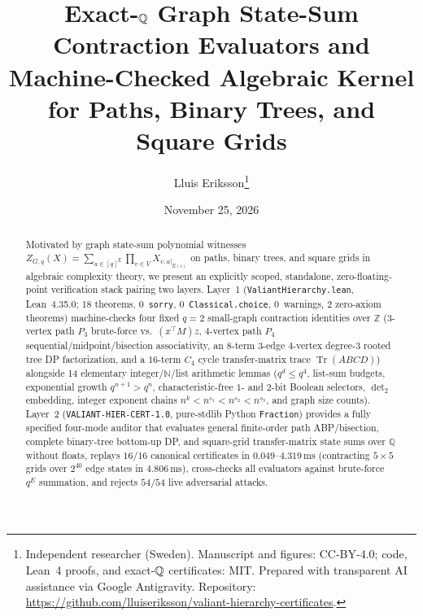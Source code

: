 \documentclass[10pt,twocolumn]{article}
\title{\vspace{-0.8em}\bfseries Exact-$\QQ$ Graph State-Sum Contraction Evaluators and Machine-Checked Algebraic Kernel for Paths, Binary Trees, and Square Grids}
\author{Lluis Eriksson\thanks{Independent researcher (Sweden). Manuscript and figures: CC-BY-4.0; code, Lean~4 proofs, and exact-$\QQ$ certificates: MIT. Prepared with transparent AI assistance via Google Antigravity. Repository: \url{https://github.com/lluiseriksson/valiant-hierarchy-certificates}.}}
\date{November 25, 2026}
\newcommand{\QQ}{\mathbb{Q}}
\newcommand{\ZZ}{\mathbb{Z}}
\newcommand{\NN}{\mathbb{N}}
\newcommand{\certschema}{\texttt{VALIANT-HIER-CERT-1.0}}
\begin{document}
\maketitle
\vspace{-1.1em}

\begin{abstract}
Motivated by graph state-sum polynomial witnesses $Z_{G,q}(X) = \sum_{a \in [q]^E}\prod_{v \in V} X_{v, a|_{E(v)}}$ on paths, binary trees, and square grids in algebraic complexity theory, we present an explicitly scoped, standalone, zero-floating-point verification stack pairing two layers. Layer~1 (\texttt{ValiantHierarchy.lean}, Lean~4.35.0; 18 theorems, $0$~\texttt{sorry}, $0$~\texttt{Classical.choice}, $0$~warnings, 2 zero-axiom theorems) machine-checks four fixed $q=2$ small-graph contraction identities over $\ZZ$ ($3$-vertex path $P_3$ brute-force vs.\ $(x^\top M)z$, $4$-vertex path $P_4$ sequential/midpoint/bisection associativity, an $8$-term $3$-edge $4$-vertex degree-$3$ rooted tree DP factorization, and a $16$-term $C_4$ cycle transfer-matrix trace $\operatorname{Tr}(ABCD)$) alongside 14 elementary integer/$\NN$/list arithmetic lemmas ($q^d\le q^4$, list-sum budgets, exponential growth $q^{n+1}>q^n$, characteristic-free $1$- and $2$-bit Boolean selectors, $\det_2$ embedding, integer exponent chains $n^k < n^{s_1} < n^{s_2} < n^{s_3}$, and graph size counts). Layer~2 (\certschema{}, pure-stdlib Python \texttt{Fraction}) provides a fully specified four-mode auditor that evaluates general finite-order path ABP/bisection, complete binary-tree bottom-up DP, and square-grid transfer-matrix state sums over $\QQ$ without floats, replays $16/16$ canonical certificates in $0.049$--$4.319\,\mathrm{ms}$ (contracting $5\times 5$ grids over $2^{40}$ edge states in $4.806\,\mathrm{ms}$), cross-checks all evaluators against brute-force $q^E$ summation, and rejects $54/54$ live adversarial attacks.
\end{abstract}
\end{document}
